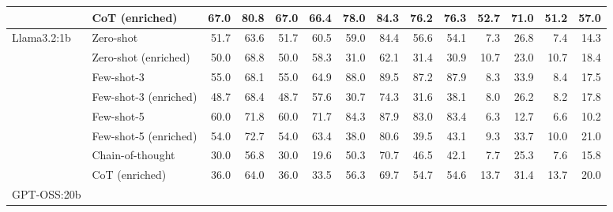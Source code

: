 \documentclass[sigconf,nonacm]{acmart}
\begin{document}
\begin{table}[t]
\begin{adjustbox}{width=\textwidth}
\begin{tabular}{@{}llrrrrrrrrrrrr@{}}
& \cellcolor{gray!10}CoT (enriched) & \cellcolor{gray!10}67.0 & \cellcolor{gray!10}80.8 & \cellcolor{gray!10}67.0 & \cellcolor{gray!10}66.4 & \cellcolor{gray!10}78.0 & \cellcolor{gray!10}84.3 & \cellcolor{gray!10}76.2 & \cellcolor{gray!10}76.3 & \cellcolor{gray!10}52.7 & \cellcolor{gray!10}71.0 & \cellcolor{gray!10}51.2 & \cellcolor{gray!10}57.0 \\
\midrule
\multirow{8}{*}{Llama3.2:1b} 
& Zero-shot & 51.7 & 63.6 & 51.7 & 60.5 & 59.0 & 84.4 & 56.6 & 54.1 & 7.3 & 26.8 & 7.4 & 14.3 \\
& \cellcolor{gray!10}Zero-shot (enriched) & \cellcolor{gray!10}50.0 & \cellcolor{gray!10}68.8 & \cellcolor{gray!10}50.0 & \cellcolor{gray!10}58.3 & \cellcolor{gray!10}31.0 & \cellcolor{gray!10}62.1 & \cellcolor{gray!10}31.4 & \cellcolor{gray!10}30.9 & \cellcolor{gray!10}10.7 & \cellcolor{gray!10}23.0 & \cellcolor{gray!10}10.7 & \cellcolor{gray!10}18.4 \\
& Few-shot-3 & 55.0 & 68.1 & 55.0 & 64.9 & 88.0 & 89.5 & 87.2 & 87.9 & 8.3 & 33.9 & 8.4 & 17.5 \\
& \cellcolor{gray!10}Few-shot-3 (enriched) & \cellcolor{gray!10}48.7 & \cellcolor{gray!10}68.4 & \cellcolor{gray!10}48.7 & \cellcolor{gray!10}57.6 & \cellcolor{gray!10}30.7 & \cellcolor{gray!10}74.3 & \cellcolor{gray!10}31.6 & \cellcolor{gray!10}38.1 & \cellcolor{gray!10}8.0 & \cellcolor{gray!10}26.2 & \cellcolor{gray!10}8.2 & \cellcolor{gray!10}17.8 \\
& Few-shot-5 & 60.0 & 71.8 & 60.0 & 71.7 & 84.3 & 87.9 & 83.0 & 83.4 & 6.3 & 12.7 & 6.6 & 10.2 \\
& \cellcolor{gray!10}Few-shot-5 (enriched) & \cellcolor{gray!10}54.0 & \cellcolor{gray!10}72.7 & \cellcolor{gray!10}54.0 & \cellcolor{gray!10}63.4 & \cellcolor{gray!10}38.0 & \cellcolor{gray!10}80.6 & \cellcolor{gray!10}39.5 & \cellcolor{gray!10}43.1 & \cellcolor{gray!10}9.3 & \cellcolor{gray!10}33.7 & \cellcolor{gray!10}10.0 & \cellcolor{gray!10}21.0 \\
& Chain-of-thought & 30.0 & 56.8 & 30.0 & 19.6 & 50.3 & 70.7 & 46.5 & 42.1 & 7.7 & 25.3 & 7.6 & 15.8 \\
& \cellcolor{gray!10}CoT (enriched) & \cellcolor{gray!10}36.0 & \cellcolor{gray!10}64.0 & \cellcolor{gray!10}36.0 & \cellcolor{gray!10}33.5 & \cellcolor{gray!10}56.3 & \cellcolor{gray!10}69.7 & \cellcolor{gray!10}54.7 & \cellcolor{gray!10}54.6 & \cellcolor{gray!10}13.7 & \cellcolor{gray!10}31.4 & \cellcolor{gray!10}13.7 & \cellcolor{gray!10}20.0 \\
\midrule
\multirow{8}{*}{GPT-OSS:20b} 

\end{tabular}
\end{adjustbox}
\end{table}
\end{document}
